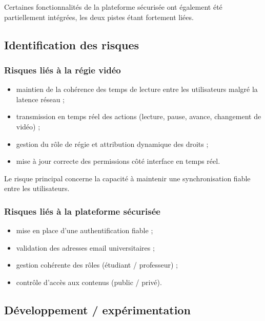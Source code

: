 \documentclass[12pt,a4paper]{report}
\begin{document}
Certaines fonctionnalités de la plateforme sécurisée ont également été partiellement
intégrées, les deux pistes étant fortement liées.

\subsection{Identification des risques}

\subsubsection{Risques liés à la régie vidéo}

\begin{itemize}
  \item maintien de la cohérence des temps de lecture entre les utilisateurs malgré la latence réseau ;
  \item transmission en temps réel des actions (lecture, pause, avance, changement de vidéo) ;
  \item gestion du rôle de régie et attribution dynamique des droits ;
  \item mise à jour correcte des permissions côté interface en temps réel.
\end{itemize}

Le risque principal concerne la capacité à maintenir une synchronisation fiable
entre les utilisateurs.

\subsubsection{Risques liés à la plateforme sécurisée}

\begin{itemize}
  \item mise en place d’une authentification fiable ;
  \item validation des adresses email universitaires ;
  \item gestion cohérente des rôles (étudiant / professeur) ;
  \item contrôle d’accès aux contenus (public / privé).
\end{itemize}

\subsection{Développement / expérimentation}
\end{document}
